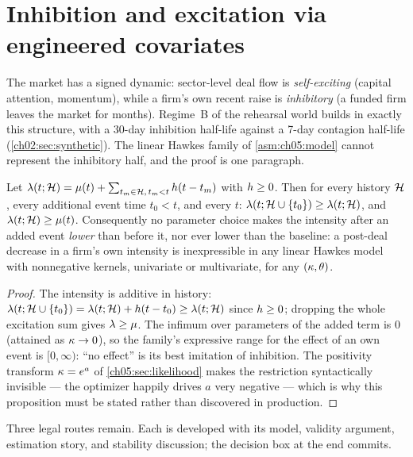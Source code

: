 \section{Inhibition and excitation via engineered
covariates}\label{ch05:sec:inhibition}

The market has a signed dynamic: sector-level deal flow is
\emph{self-exciting} (capital attention, momentum), while a firm's own
recent raise is \emph{inhibitory} (a funded firm leaves the market for
months). Regime~B of the rehearsal world builds in exactly this
structure, with a 30-day inhibition half-life against a 7-day contagion
half-life (\cref{ch02:sec:synthetic}). The linear Hawkes family of
\cref{asm:ch05:model} cannot represent the inhibitory half, and the proof
is one paragraph.

\begin{proposition}\label{prop:ch05:monotone}
Let $\lambda(t; \mathcal{H}) = \mu(t) + \sum_{t_m \in \mathcal{H},\, t_m < t}
h(t - t_m)$ with $h \ge 0$. Then for every history $\mathcal{H}$,
every additional event time $t_0 < t$, and every $t$:
$\lambda(t; \mathcal{H} \cup \{t_0\}) \ge \lambda(t; \mathcal{H})$, and $\lambda(t;\mathcal{H}) \ge
\mu(t)$. Consequently no parameter choice makes the intensity after an
added event \emph{lower} than before it, nor ever lower than the
baseline: a post-deal decrease in a firm's own intensity is inexpressible
in any linear Hawkes model with nonnegative kernels, univariate or
multivariate, for any $(\kappa, \theta)$.
\end{proposition}

\begin{proof}
The intensity is additive in history: $\lambda(t; \mathcal{H}\cup\{t_0\}) =
\lambda(t;\mathcal{H}) + h(t - t_0) \ge \lambda(t;\mathcal{H})$ since $h \ge
0$; dropping the whole excitation sum gives $\lambda \ge \mu$. The infimum
over parameters of the added term is $0$ (attained as $\kappa \to 0$),
so the family's expressive range for the effect of an own event is
$[0, \infty)$: ``no effect'' is its best imitation of inhibition. The
positivity transform $\kappa = e^{a}$ of
\cref{ch05:sec:likelihood} makes the restriction syntactically invisible
--- the optimizer happily drives $a$ very negative --- which is why this
proposition must be stated rather than discovered in production.
\end{proof}

Three legal routes remain. Each is developed with its model, validity
argument, estimation story, and stability discussion; the decision box at
the end commits.

